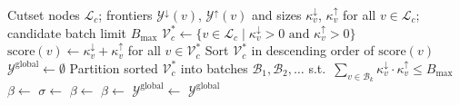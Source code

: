 \documentclass[letterpaper]{article}
\begin{document}
\begin{algorithm}[tbp!]
\caption{GPU Subroutine: Cutset Coupling}
\label{alg:gpu_cutset_coupling}
\begin{algorithmic}[1]
\Require Cutset nodes $\mathcal{L}_c$; frontiers $\mathcal{Y}^{\downarrow}(v)$, $\mathcal{Y}^{\uparrow}(v)$ and sizes $\kappa^{\downarrow}_v$, $\kappa^{\uparrow}_v$ for all $v \in \mathcal{L}_c$; candidate batch limit $B_{\max}$
\State $\mathcal{V}^*_c \gets \{v \in \mathcal{L}_c \mid \kappa^{\downarrow}_v > 0 \text{ and } \kappa^{\uparrow}_v > 0\}$ 
\State $\text{score}(v) \gets \kappa^{\downarrow}_v + \kappa^{\uparrow}_v$ for all $v \in \mathcal{V}^*_c$
\State Sort $\mathcal{V}^*_c$ in descending order of $\text{score}(v)$
\State $\mathcal{Y}^{\text{global}} \gets \emptyset$ 
\State Partition sorted $\mathcal{V}^*_c$ into batches $\mathcal{B}_1, \mathcal{B}_2, \dots$ s.t.\ $\sum_{v \in \mathcal{B}_k} \kappa^{\downarrow}_v \cdot \kappa^{\uparrow}_v \le B_{\max}$
    \State $\beta \gets$ 
        \State $\sigma \gets$  
        \State $\beta \gets$ 
    \EndIf
    \State $\beta \gets$  
    \State $\mathcal{Y}^{\text{global}} \gets$  
\EndFor
\State \Return $\mathcal{Y}^{\text{global}}$
\end{algorithmic}
\end{algorithm}
\end{document}
